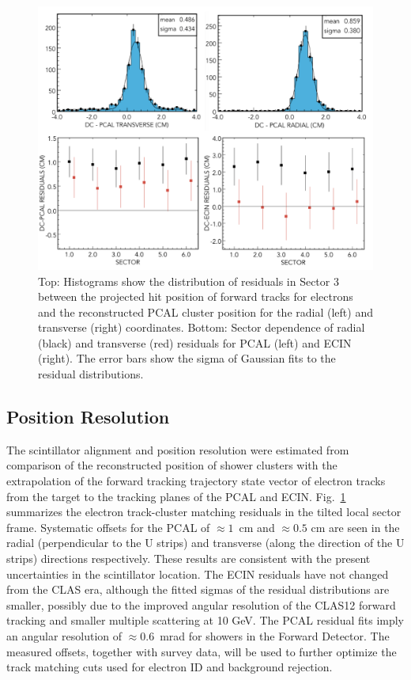 \begin{figure}[t]
\centering
\includegraphics[width=1.0\columnwidth,keepaspectratio]{img/S10_1_3.png}
\caption[]{Top: Histograms show the distribution of residuals in Sector 3 between the projected hit position of forward tracks for electrons and the reconstructed PCAL cluster position for the radial (left) and transverse (right) coordinates. Bottom: Sector dependence of radial (black) and transverse (red) residuals for PCAL (left) and ECIN (right).  The error bars show the sigma of Gaussian fits to the residual distributions.}
\label{fig:S10_1_3}
\end{figure}

\subsection{Position Resolution}
The scintillator alignment and position resolution were estimated from comparison of the reconstructed position of shower clusters with the extrapolation of the forward tracking trajectory state vector of electron tracks from the target to the tracking planes of the PCAL and ECIN.  
Fig.~\ref{fig:S10_1_3} summarizes the electron track-cluster matching residuals in the tilted local sector frame.   Systematic offsets for the PCAL of $\approx 1$~cm and $\approx 0.5$ cm are seen in the radial (perpendicular to the U strips) and transverse (along the direction of the U strips) directions respectively.  These results are consistent with the present uncertainties in the scintillator location. The ECIN residuals have not changed from the CLAS era, although the fitted sigmas of the residual distributions are smaller, possibly due to the improved angular resolution of the CLAS12 forward tracking and smaller multiple scattering at 10 GeV.  The PCAL residual fits imply an angular resolution of $\approx 0.6$~mrad for showers in the Forward Detector.  The measured offsets, together with survey data, will be used to further optimize the track matching cuts used for electron ID and background rejection. 

